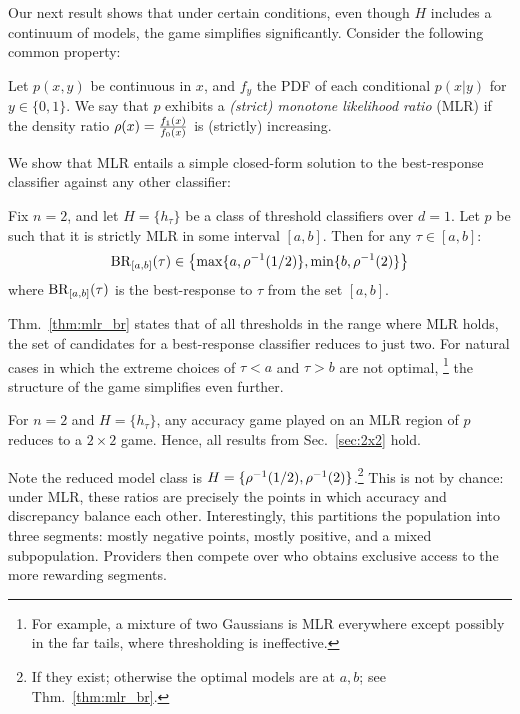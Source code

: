 Our next result shows that under certain conditions,
even though $H$ includes a continuum of models,
the game simplifies significantly.
Consider the following common property:
\begin{definition}[MLR]
\label{def:mlrp}
Let $p(x,y)$ be continuous in $x$,
and $f_y$ the PDF of each conditional $p(x|y)$ for $y \in \{0,1\}$.
We say that $p$ exhibits a \emph{(strict) monotone likelihood ratio} (MLR)
if the density ratio $\rho(x) = \frac{f_1(x)}{f_0(x)}$ is (strictly) increasing.
\end{definition}
We show that MLR entails a simple closed-form solution
to the best-response classifier against any other classifier:
\squeeze
\begin{theorem}
\label{thm:mlr_br}
Fix $n=2$, and let $H = \{h_\tau\}$ be a class of threshold classifiers over $d=1$.
Let $p$ be such that it is strictly MLR in some interval $[a,b]$.
Then for any $\tau \in [a,b]$:
\[
\mathrm{BR}_{[a,b]}(\tau) \in \left\{
\max\{a, \rho^{-1}(1/2)\},
\min \{b, \rho^{-1}(2) \}
\right\}
\]
where $\mathrm{BR}_{[a,b]}(\tau)$ is the best-response to $\tau$ from the set $[a,b]$.
\end{theorem}

Thm.~\ref{thm:mlr_br} states that of all thresholds in the range where MLR holds, the set of candidates for a best-response classifier reduces to just two. 
For natural cases in which the extreme choices of $\tau < a$ and $\tau > b$ are not optimal,%
\footnote{For example, a mixture of two Gaussians is MLR everywhere
except possibly in the far tails, where thresholding is ineffective.}
the structure of the game simplifies even further.
\begin{corollary}
\label{corr:thresh-2x2_reduction}
For $n=2$ and $H=\{h_\tau\}$,
any accuracy game played on an MLR region of $p$ reduces
to a $2 \times 2$ game. Hence, all results from Sec.~\ref{sec:2x2} hold.
\end{corollary}
Note the reduced model class is
$H = \{\rho^{-1}(1/2), \rho^{-1}(2)\}$.\footnote{If they exist; otherwise the optimal models are at $a,b$; see Thm.~\ref{thm:mlr_br}.}
This is not by chance:
under MLR, these ratios are precisely the points in which accuracy and discrepancy balance each other.
Interestingly, this partitions the population into three segments:
mostly negative points, mostly positive, and a mixed subpopulation.
Providers then compete over who obtains exclusive access to the more rewarding segments.

